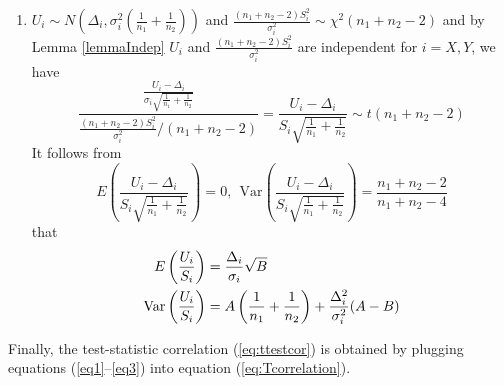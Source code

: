 \begin{enumerate}
	\item $U_i\sim N\left(\Delta_i, \sigma_i^2(\frac{1}{n_1} + \frac{1}{n_2})\right)$ and 
	$\frac{(n_1 + n_2 -2)S_i^2}{\sigma_i^2} \sim
	\chi^2(n_1 + n_2-2)$ and by Lemma \ref{lemmaIndep}  $U_i$ and $\frac{(n_1 + n_2 
		-2)S_i^2}{\sigma_i^2}$ are independent for $i = X, Y$, we have 
	\begin{equation}
	\frac{\frac{U_i-\Delta_i}{\sigma_i\sqrt{\frac{1}{n_1} + \frac{1}{n_2}}}}{\frac{(n_1 + 
			n_2-2)S_i^2}{\sigma_i^2}/(n_1 + n_2 -2)}  =
	\frac{U_i-\Delta_i}{S_i\sqrt{\frac{1}{n_1 } + \frac{1}{n_2}}}\sim t(n_1 + n_2-2)
	\end{equation}	
	It follows from 
	\begin{equation}
	E\left(\frac{U_i-\Delta_i}{S_i\sqrt{\frac{1}{n_1} + \frac{1}{n_2}}}\right)=0, ~~ 
	\text{Var}\left(\frac{U_i-\Delta_i}{S_i\sqrt{\frac{1}{n_1} + \frac{1}{n_2}}}\right) = 
	\frac{n_1 + n_2-2}{n_1 + n_2-4}
	\end{equation}
	that
	\begin{equation}\label{eq3}
	\begin{aligned}
	E\left(\frac{U_i}{S_i}\right) &= \frac{\Delta_i}{\sigma_i}\sqrt{B} \\
	\text{Var}\left(\frac{U_i}{S_i}\right)&=A\left(\frac{1}{n_1} + \frac{1}{n_2}\right) + 
	\frac{\Delta_i^2}{\sigma_i^2}(A-B)
	\end{aligned}
	\end{equation}
\end{enumerate}
Finally,  the test-statistic correlation (\ref{eq:ttestcor}) is obtained by plugging
equations (\ref{eq1}--\ref{eq3}) into equation (\ref{eq:Tcorrelation}).

